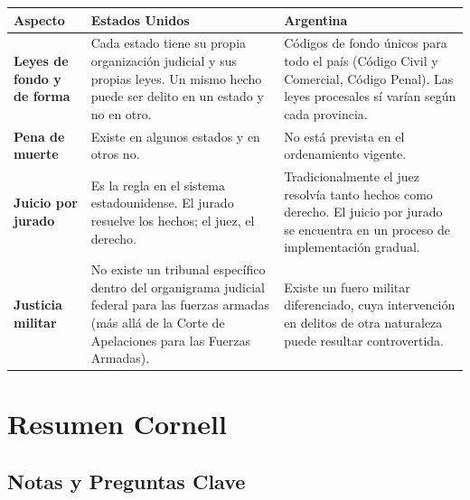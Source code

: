 \documentclass[12pt,oneside]{book}
\begin{document}
\begin{table}[H]
\centering
\begin{tabularx}{\textwidth}{p{3.5cm} X X}
\toprule
\textbf{Aspecto} & \textbf{Estados Unidos} & \textbf{Argentina} \\
\midrule
\textbf{Leyes de fondo y de forma} & Cada estado tiene su propia organización judicial y sus propias leyes. Un mismo hecho puede ser delito en un estado y no en otro. & Códigos de fondo únicos para todo el país (Código Civil y Comercial, Código Penal). Las leyes procesales sí varían según cada provincia. \\
\midrule
\textbf{Pena de muerte} & Existe en algunos estados y en otros no. & No está prevista en el ordenamiento vigente. \\
\midrule
\textbf{Juicio por jurado} & Es la regla en el sistema estadounidense. El jurado resuelve los hechos; el juez, el derecho. & Tradicionalmente el juez resolvía tanto hechos como derecho. El juicio por jurado se encuentra en un proceso de implementación gradual. \\
\midrule
\textbf{Justicia militar} & No existe un tribunal específico dentro del organigrama judicial federal para las fuerzas armadas (más allá de la Corte de Apelaciones para las Fuerzas Armadas). & Existe un fuero militar diferenciado, cuya intervención en delitos de otra naturaleza puede resultar controvertida. \\
\bottomrule
\end{tabularx}
\end{table}

\newpage

\chapter*{Resumen Cornell}

\section*{Notas y Preguntas Clave}
\end{document}
